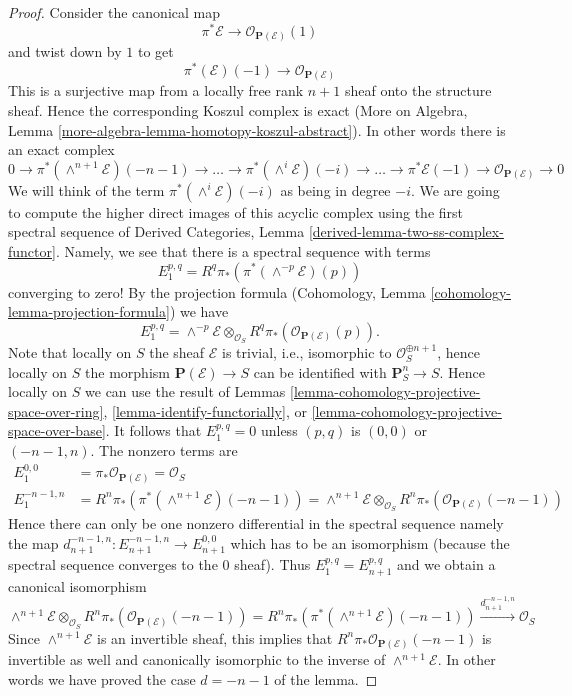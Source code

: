 \documentclass[10pt,a4paper]{amsart}
\theoremstyle{plain}
\theoremstyle{definition}
\theoremstyle{remark}
\numberwithin{equation}{subsection}
\begin{document}
\begin{proof}
Consider the canonical map
$$
\pi^*\mathcal{E} \longrightarrow \mathcal{O}_{\mathbf{P}(\mathcal{E})}(1)
$$
and twist down by $1$ to get
$$
\pi^*(\mathcal{E})(-1) \longrightarrow \mathcal{O}_{\mathbf{P}(\mathcal{E})}
$$
This is a surjective map from a locally free rank $n + 1$ sheaf onto
the structure sheaf. Hence the corresponding Koszul complex is
exact (More on Algebra, Lemma
\ref{more-algebra-lemma-homotopy-koszul-abstract}).
In other words there is an exact complex
$$
0 \to
\pi^*(\wedge^{n + 1}\mathcal{E})(-n - 1) \to
\ldots \to
\pi^*(\wedge^i\mathcal{E})(-i) \to
\ldots \to
\pi^*\mathcal{E}(-1) \to
\mathcal{O}_{\mathbf{P}(\mathcal{E})} \to 0
$$
We will think of the term $\pi^*(\wedge^i\mathcal{E})(-i)$ as being
in degree $-i$.
We are going to compute the higher direct images
of this acyclic complex using the first spectral sequence of
Derived Categories, Lemma \ref{derived-lemma-two-ss-complex-functor}.
Namely, we see that there is a spectral sequence with terms
$$
E_1^{p, q} = R^q\pi_*\left(\pi^*(\wedge^{-p}\mathcal{E})(p)\right)
$$
converging to zero! By the projection formula
(Cohomology, Lemma \ref{cohomology-lemma-projection-formula})
we have
$$
E_1^{p, q} = \wedge^{-p} \mathcal{E} \otimes_{\mathcal{O}_S}
R^q\pi_*\left(\mathcal{O}_{\mathbf{P}(\mathcal{E})}(p)\right).
$$
Note that locally on $S$ the sheaf $\mathcal{E}$ is trivial,
i.e., isomorphic to $\mathcal{O}_S^{\oplus n + 1}$, hence locally on
$S$ the morphism $\mathbf{P}(\mathcal{E}) \to S$ can be identified
with $\mathbf{P}^n_S \to S$. Hence
locally on $S$ we can use the result of Lemmas
\ref{lemma-cohomology-projective-space-over-ring},
\ref{lemma-identify-functorially}, or
\ref{lemma-cohomology-projective-space-over-base}.
It follows that $E_1^{p, q} = 0$ unless $(p, q)$ is $(0, 0)$
or $(-n - 1, n)$. The nonzero terms are
\begin{align*}
E_1^{0, 0} & = \pi_*\mathcal{O}_{\mathbf{P}(\mathcal{E})} = \mathcal{O}_S \\
E_1^{-n - 1, n} & =
R^n\pi_*\left(\pi^*(\wedge^{n + 1}\mathcal{E})(-n - 1)\right) =
\wedge^{n + 1}\mathcal{E} \otimes_{\mathcal{O}_S}
R^n\pi_*\left(\mathcal{O}_{\mathbf{P}(\mathcal{E})}(-n - 1)\right)
\end{align*}
Hence there can only be one nonzero
differential in the spectral sequence namely the map
$d_{n + 1}^{-n - 1, n} : E_{n + 1}^{-n - 1, n} \to E_{n + 1}^{0, 0}$
which has to be an isomorphism (because the spectral sequence converges
to the $0$ sheaf). Thus $E_1^{p, q} = E_{n + 1}^{p, q}$ and
we obtain a canonical isomorphism
$$
\wedge^{n + 1}\mathcal{E} \otimes_{\mathcal{O}_S}
R^n\pi_*\left(\mathcal{O}_{\mathbf{P}(\mathcal{E})}(-n - 1)\right) =
R^n\pi_*\left(\pi^*(\wedge^{n + 1}\mathcal{E})(-n - 1)\right)
\xrightarrow{d_{n + 1}^{-n - 1, n}}
\mathcal{O}_S
$$
Since $\wedge^{n + 1}\mathcal{E}$ is an invertible
sheaf, this implies that
$R^n\pi_*\mathcal{O}_{\mathbf{P}(\mathcal{E})}(-n - 1)$ is invertible
as well and canonically isomorphic to the inverse of
$\wedge^{n + 1}\mathcal{E}$. In other words we have proved the case
$d = - n - 1$ of the lemma.


\end{proof}
\end{document}
